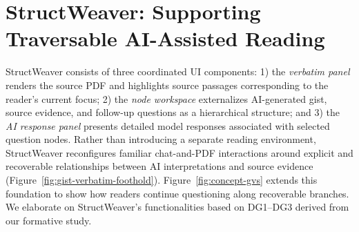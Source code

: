 \documentclass[manuscript,review,anonymous]{acmart}
\begin{document}




\section{StructWeaver: Supporting Traversable AI-Assisted Reading}
\label{sec:structweaver}

StructWeaver consists of three coordinated UI components: 1) the \textit{verbatim panel} renders the source PDF and highlights source passages corresponding to the reader's current focus; 2) the \textit{node workspace} externalizes AI-generated gist, source evidence, and follow-up questions as a hierarchical structure; and 3) the \textit{AI response panel} presents detailed model responses associated with selected question nodes. Rather than introducing a separate reading environment, StructWeaver reconfigures familiar chat-and-PDF interactions around explicit and recoverable relationships between AI interpretations and source evidence (Figure~\ref{fig:gist-verbatim-foothold}). Figure~\ref{fig:concept-gvs} extends this foundation to show how readers continue questioning along recoverable branches. We elaborate on StructWeaver's functionalities based on DG1--DG3 derived from our formative study.
\end{document}

